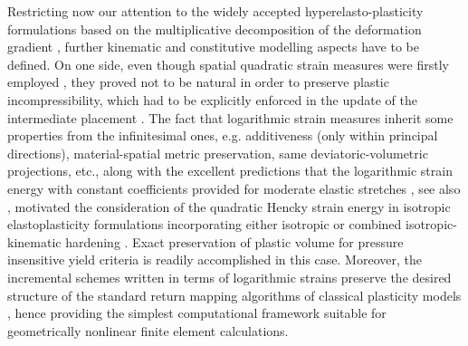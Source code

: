 \documentclass[preprint,review,12pt,sort&compress]{elsarticle}%
\begin{document}
Restricting now our attention to the widely accepted hyperelasto-plasticity
formulations based on the multiplicative decomposition of the deformation
gradient \cite{Lee69,Mandel74}, further kinematic and constitutive modelling
aspects have to be defined. On one side, even though spatial quadratic strain
measures were firstly employed \cite{Simo88}, they proved not to be natural in
order to preserve plastic incompressibility, which had to be explicitly
enforced in the update of the intermediate placement \cite{SimoMiehe92}. The
fact that logarithmic strain measures inherit some properties from the
infinitesimal ones, e.g. additiveness (only within principal directions),
material-spatial metric preservation, same deviatoric-volumetric projections,
etc., along with the excellent predictions that the logarithmic strain energy
with constant coefficients provided for moderate elastic stretches
\cite{Anand79,Anand86}, see also \cite{Rice75,RolphBathe84}, motivated the
consideration of the quadratic Hencky strain energy in isotropic
elastoplasticity formulations incorporating either isotropic or combined
isotropic-kinematic hardening
\cite{WeberAnand90,EterovicBathe90,PericOwenHonnor92,CuitinoOrtiz92,Simo92}.
Exact preservation of plastic volume for pressure insensitive yield criteria
is readily accomplished in this case. Moreover, the incremental schemes
written in terms of logarithmic strains preserve the desired structure of the
standard return mapping algorithms of classical plasticity models
\cite{Simo92}, hence providing the simplest computational framework suitable
for geometrically nonlinear finite element calculations.
\end{document}
